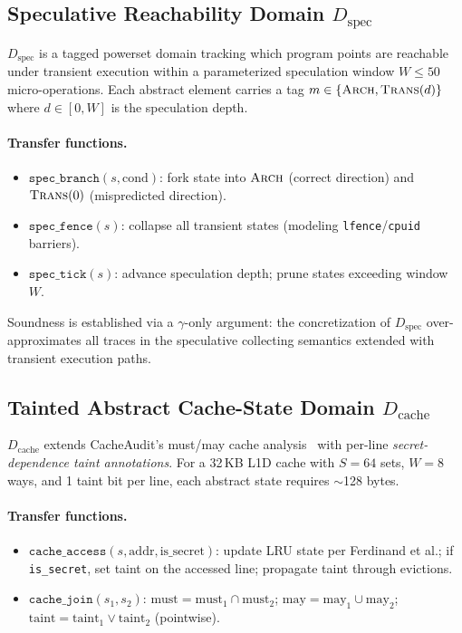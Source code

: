 \documentclass{article}
\theoremstyle{definition}
\theoremstyle{remark}
\newcommand{\Dspec}{D_{\text{spec}}}
\newcommand{\Dcache}{D_{\text{cache}}}
\begin{document}
\subsection{Speculative Reachability Domain $\Dspec$}
\label{sec:dspec}

$\Dspec$ is a tagged powerset domain tracking which program points are reachable
under transient execution within a parameterized speculation window $W \leq 50$
micro-operations.  Each abstract element carries a tag
$m \in \{\textsc{Arch}, \textsc{Trans}(d)\}$ where $d \in [0, W]$ is the
speculation depth.

\paragraph{Transfer functions.}
\begin{itemize}[nosep]
  \item $\texttt{spec\_branch}(s, \text{cond})$: fork state into
    $\textsc{Arch}$ (correct direction) and $\textsc{Trans}(0)$ (mispredicted
    direction).
  \item $\texttt{spec\_fence}(s)$: collapse all transient states (modeling
    \texttt{lfence}/\texttt{cpuid} barriers).
  \item $\texttt{spec\_tick}(s)$: advance speculation depth; prune states
    exceeding window $W$.
\end{itemize}

\noindent
Soundness is established via a $\gamma$-only argument: the concretization of
$\Dspec$ over-approximates all traces in the speculative collecting
semantics extended with transient execution paths.

\subsection{Tainted Abstract Cache-State Domain $\Dcache$}
\label{sec:dcache}

$\Dcache$ extends CacheAudit's must/may cache
analysis~\cite{doychev2015cacheaudit} with per-line \emph{secret-dependence
taint annotations}.  For a 32\,KB L1D cache with $S = 64$ sets, $W = 8$ ways,
and 1 taint bit per line, each abstract state requires $\sim$128 bytes.

\paragraph{Transfer functions.}
\begin{itemize}[nosep]
  \item $\texttt{cache\_access}(s, \text{addr}, \text{is\_secret})$: update LRU
    state per Ferdinand et al.; if \texttt{is\_secret}, set taint on the
    accessed line; propagate taint through evictions.
  \item $\texttt{cache\_join}(s_1, s_2)$: $\text{must} = \text{must}_1 \cap
    \text{must}_2$; $\text{may} = \text{may}_1 \cup \text{may}_2$;
    $\text{taint} = \text{taint}_1 \lor \text{taint}_2$ (pointwise).
\end{itemize}
\end{document}
